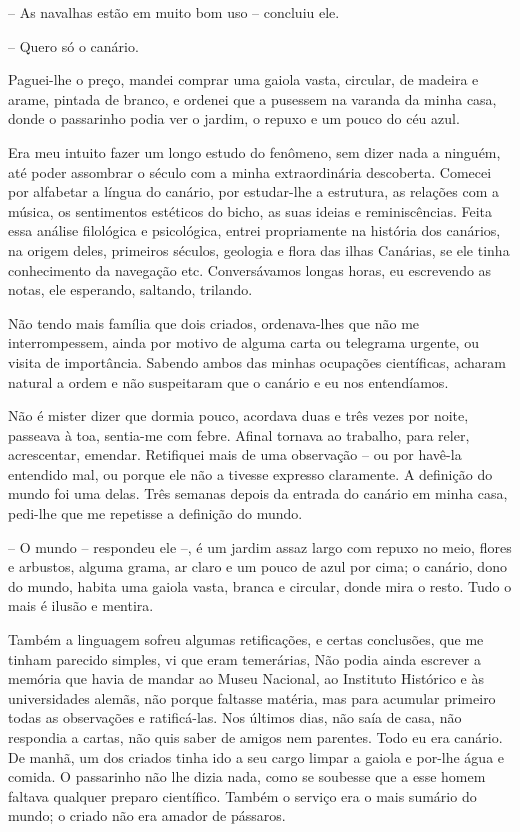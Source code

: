 -- As navalhas estão em muito bom uso -- concluiu ele.

-- Quero só o canário.

Paguei-lhe o preço, mandei comprar uma gaiola vasta, circular, de
madeira e arame, pintada de branco, e ordenei que a pusessem na varanda
da minha casa, donde o passarinho podia ver o jardim, o repuxo e um
pouco do céu azul.

Era meu intuito fazer um longo estudo do fenômeno, sem dizer nada a
ninguém, até poder assombrar o século com a minha extraordinária
descoberta. Comecei por alfabetar a língua do canário, por estudar-lhe a
estrutura, as relações com a música, os sentimentos estéticos do bicho,
as suas ideias e reminiscências. Feita essa análise filológica e
psicológica, entrei propriamente na história dos canários, na origem
deles, primeiros séculos, geologia e flora das ilhas Canárias, se ele
tinha conhecimento da navegação etc. Conversávamos longas horas, eu
escrevendo as notas, ele esperando, saltando, trilando.

Não tendo mais família que dois criados, ordenava-lhes que não me
interrompessem, ainda por motivo de alguma carta ou telegrama urgente,
ou visita de importância. Sabendo ambos das minhas ocupações
científicas, acharam natural a ordem e não suspeitaram que o canário e
eu nos entendíamos.

Não é mister dizer que dormia pouco, acordava duas e três vezes por
noite, passeava à toa, sentia-me com febre. Afinal tornava ao trabalho,
para reler, acrescentar, emendar. Retifiquei mais de uma observação --
ou por havê-la entendido mal, ou porque ele não a tivesse expresso
claramente. A definição do mundo foi uma delas. Três semanas depois da
entrada do canário em minha casa, pedi-lhe que me repetisse a definição
do mundo.

-- O mundo -- respondeu ele --, é um jardim assaz largo com repuxo no
meio, flores e arbustos, alguma grama, ar claro e um pouco de azul por
cima; o canário, dono do mundo, habita uma gaiola vasta, branca e
circular, donde mira o resto. Tudo o mais é ilusão e mentira.

Também a linguagem sofreu algumas retificações, e certas conclusões, que
me tinham parecido simples, vi que eram temerárias, Não podia ainda
escrever a memória que havia de mandar ao Museu Nacional, ao Instituto
Histórico e às universidades alemãs, não porque faltasse matéria, mas
para acumular primeiro todas as observações e ratificá-las. Nos últimos
dias, não saía de casa, não respondia a cartas, não quis saber de amigos
nem parentes. Todo eu era canário. De manhã, um dos criados tinha ido a
seu cargo limpar a gaiola e por-lhe água e comida. O passarinho não lhe
dizia nada, como se soubesse que a esse homem faltava qualquer preparo
científico. Também o serviço era o mais sumário do mundo; o criado não
era amador de pássaros.


